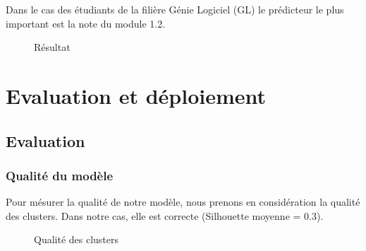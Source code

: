 \documentclass{article}
\begin{document}
            \par Dans le cas des étudiants de la filière Génie Logiciel (GL) le prédicteur le plus important est la note du module 1.2.
            \newpage \begin{figure}[h!]
                \caption{Résultat}
                \label{fig:24}
            \end{figure} 
            \newpage \section{Evaluation et déploiement}
            \subsection{Evaluation}
            \subsubsection{Qualité du modèle}
            Pour mésurer la qualité de notre modèle, nous prenons en considération la qualité des clusters. Dans notre cas, elle est correcte (Silhouette moyenne = 0.3).
            \begin{figure}[h!]
                \centering
                \caption{Qualité des clusters}
                \label{fig:25}
            \end{figure} 
\end{document}
